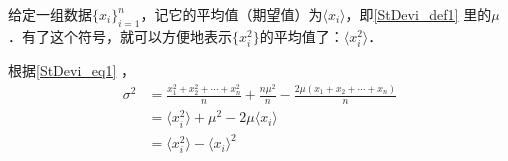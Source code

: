 给定一组数据$\{x_i\}_{i=1}^n$，记它的平均值（期望值）为$\langle x_i \rangle$，即\autoref{StDevi_def1} 里的$\mu$．有了这个符号，就可以方便地表示$\{x_i^2\}$的平均值了：$\langle x_i^2 \rangle$．

根据\autoref{StDevi_eq1} ，
\begin{equation}
\begin{aligned}
\sigma^2 &= \frac{x_1^2+x_2^2+\cdots+x_n^2}{n}+\frac{n\mu^2}{n}-\frac{2\mu(x_1+x_2+\cdots+x_n)}{n}\\
&=\langle x_i^2 \rangle+\mu^2-2\mu\langle x_i \rangle\\
&=\langle x_i^2 \rangle-\langle x_i \rangle^2
\end{aligned}
\end{equation}
